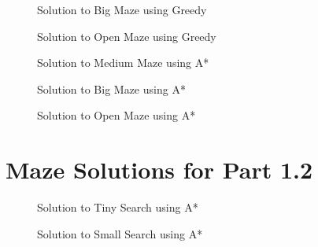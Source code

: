 \documentclass{article}[12pt]
\begin{document}
\begin{appendices}
   \begin{figure}[!htb]
   \centering
   \caption{Solution to Big Maze using Greedy}
   \label{fig:greedy_bigmaze}
   \end{figure}
   
   \begin{figure}[!htb]
   \centering
   \caption{Solution to Open Maze using Greedy}
   \label{fig:greedy_openmaze}
   \end{figure}
   
   
   \begin{figure}[!htb]
   \centering
   \caption{Solution to Medium Maze using A*}
   \label{fig:astar_medmaze}
   \end{figure}
   
   \begin{figure}[!htb]
   \centering
   \caption{Solution to Big Maze using A*}
   \label{fig:astar_bigmaze}
   \end{figure}
   
   \begin{figure}[!htb]
   \centering
   \caption{Solution to Open Maze using A*}
   \label{fig:astar_openmaze}
   \end{figure}
   
   \section{Maze Solutions for Part 1.2}
   \label{appendix:p12}
   
   \begin{figure}[!htb]
   \centering
   \caption{Solution to Tiny Search using A*}
   \label{fig:astar_ts_chull}
   \end{figure}
   
   \begin{figure}[!htb]
   \centering
   \caption{Solution to Small Search using A*}
   \label{fig:astar_ss_chull}
   \end{figure}
   

\end{appendices}
\end{document}
